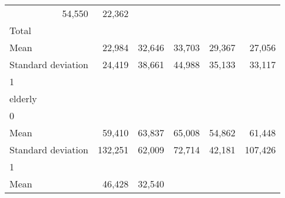 \begin{tabular}{llllll}
  \multicolumn{1}{r}{54,550} &
  \multicolumn{1}{r}{22,362} \\
\multicolumn{1}{l}{\hspace{3em}Total} &
  \multicolumn{1}{|r}{} &
  \multicolumn{1}{r}{} &
  \multicolumn{1}{r}{} &
  \multicolumn{1}{r}{} &
  \multicolumn{1}{r}{} \\
\multicolumn{1}{l}{\hspace{4em}Mean} &
  \multicolumn{1}{|r}{22,984} &
  \multicolumn{1}{r}{32,646} &
  \multicolumn{1}{r}{33,703} &
  \multicolumn{1}{r}{29,367} &
  \multicolumn{1}{r}{27,056} \\
\multicolumn{1}{l}{\hspace{4em}Standard deviation} &
  \multicolumn{1}{|r}{24,419} &
  \multicolumn{1}{r}{38,661} &
  \multicolumn{1}{r}{44,988} &
  \multicolumn{1}{r}{35,133} &
  \multicolumn{1}{r}{33,117} \\
\multicolumn{1}{l}{\hspace{1em}1} &
  \multicolumn{1}{|r}{} &
  \multicolumn{1}{r}{} &
  \multicolumn{1}{r}{} &
  \multicolumn{1}{r}{} &
  \multicolumn{1}{r}{} \\
\multicolumn{1}{l}{\hspace{2em}elderly} &
  \multicolumn{1}{|r}{} &
  \multicolumn{1}{r}{} &
  \multicolumn{1}{r}{} &
  \multicolumn{1}{r}{} &
  \multicolumn{1}{r}{} \\
\multicolumn{1}{l}{\hspace{3em}0} &
  \multicolumn{1}{|r}{} &
  \multicolumn{1}{r}{} &
  \multicolumn{1}{r}{} &
  \multicolumn{1}{r}{} &
  \multicolumn{1}{r}{} \\
\multicolumn{1}{l}{\hspace{4em}Mean} &
  \multicolumn{1}{|r}{59,410} &
  \multicolumn{1}{r}{63,837} &
  \multicolumn{1}{r}{65,008} &
  \multicolumn{1}{r}{54,862} &
  \multicolumn{1}{r}{61,448} \\
\multicolumn{1}{l}{\hspace{4em}Standard deviation} &
  \multicolumn{1}{|r}{132,251} &
  \multicolumn{1}{r}{62,009} &
  \multicolumn{1}{r}{72,714} &
  \multicolumn{1}{r}{42,181} &
  \multicolumn{1}{r}{107,426} \\
\multicolumn{1}{l}{\hspace{3em}1} &
  \multicolumn{1}{|r}{} &
  \multicolumn{1}{r}{} &
  \multicolumn{1}{r}{} &
  \multicolumn{1}{r}{} &
  \multicolumn{1}{r}{} \\
\multicolumn{1}{l}{\hspace{4em}Mean} &
  \multicolumn{1}{|r}{46,428} &
  \multicolumn{1}{r}{32,540} &

\end{tabular}
